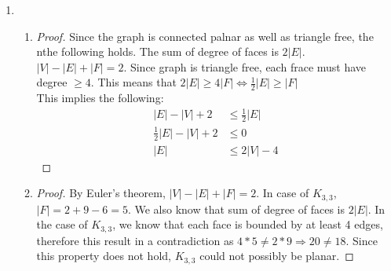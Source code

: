 \documentclass{article}
\begin{document}
\begin{enumerate} [label=(\textbf{\arabic*})]
	\item
		\begin{enumerate}
			\item 
				\begin{proof} Since the graph is connected palnar as well as triangle
				free, the nthe following holds. The sum of degree of faces is $2|E|$.
				$|V| - |E| + |F| = 2$. Since graph is triangle free, each frace must
				have degree $\ge 4$. This means that $2|E| \ge 4|F| \Leftrightarrow
				\frac{1}{2}|E| \ge |F|$\\
				This implies the following: 
				\begin{align*}
				|E| - |V| + 2 &\le \frac{1}{2}|E|\\
				\frac{1}{2}|E| - |V| + 2 &\le 0\\
				|E| &\le 2|V| - 4
				\end{align*}
				\end{proof}
			\item
				\begin{proof}
					By Euler's theorem, $|V| - |E| + |F| = 2$. In case of $K_{3,3}$,
					$|F|=2+9-6=5$. We also know that sum of degree of faces is $2|E|$. In
					the case of $K_{3,3}$, we know that each face is bounded by at least 4
					edges, therefore this result in a contradiction as $4*5 \ne 2*9
					\Rightarrow 20 \ne 18$. Since this property does not hold, $K_{3,3}$
					could not possibly be planar.
				\end{proof}

		\end{enumerate}
\end{enumerate}
\end{document}
